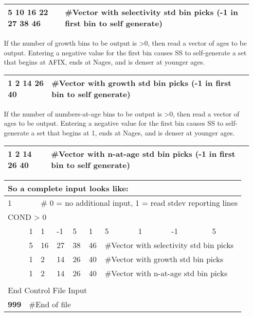 \begin{center}
	\begin{tabular}{p{4cm} p{12cm}}
		\hline
		5 10 16 22 27 38 46 & \#Vector with selectivity std bin picks (-1 in first bin to self generate)\\
		\hline
	\end{tabular}
\end{center}
If the number of growth bins to be output is >0, then read a vector of ages to be output.  Entering a negative value for the first bin causes SS to self-generate a set that begins at AFIX, ends at Nages, and is denser at younger ages.
\begin{center}
	\begin{tabular}{p{4cm} p{12cm}}
		\hline
		1 2 14 26 40 & \#Vector with growth std bin picks (-1 in first bin to self generate)\\
		\hline
	\end{tabular}
\end{center}
If the number of numbers-at-age bins to be output is >0, then read a vector of ages to be output.  Entering a negative value for the first bin causes SS to self-generate a set that begins at 1, ends at Nages, and is denser at younger ages.
\begin{center}
	\begin{tabular}{p{4cm} p{12cm}}
		\hline
		1 2 14 26 40 & \#Vector with n-at-age std bin picks (-1 in first bin to self generate)\\
		\hline
	\end{tabular}
\end{center}

\begin{center}
	\begin{longtable}{p{1cm} p{1cm} p{1cm} p{1cm} p{1cm} p{1cm} p{1cm} p{1cm} p{1cm} p{3.5cm}}

		\multicolumn{10}{l}{So a complete input looks like:}\\
		\hline
		1 & & \multicolumn{8}{l}{\# 0 = no additional input, 1 = read stdev reporting lines}\\
		\hline
		\multicolumn{10}{l}{COND > 0}\\
		& 1 & 1 & -1 & 5 & 1 & 5 & 1 & -1 & 5 \\
		& 5 & 16 & 27 & 38 & 46 & \multicolumn{4}{l}{\#Vector with selectivity std bin picks}\\
		& 1 & 2 & 14 & 26 & 40 & \multicolumn{4}{l}{\#Vector with growth std bin picks}\\
		& 1 & 2 & 14 & 26 & 40 & \multicolumn{4}{l}{\#Vector with n-at-age std bin picks}\\
		\hline
		\\
		\multicolumn{10}{l}{End Control File Input}\\
		\bfseries{999} & \multicolumn{9}{l}{\#End of file}
	\end{longtable}
\end{center}

